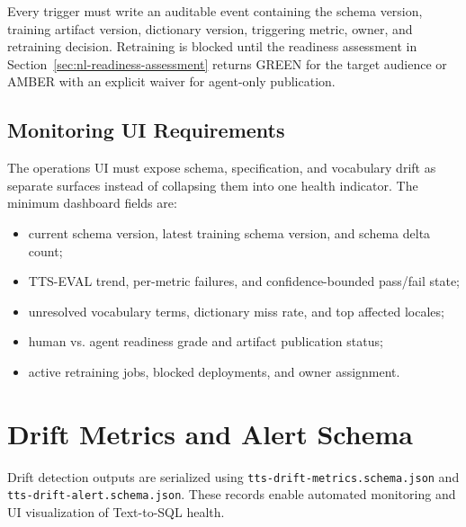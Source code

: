 \noindent
Every trigger must write an auditable event containing the schema version,
training artifact version, dictionary version, triggering metric, owner, and
retraining decision. Retraining is blocked until the readiness assessment in
Section~\ref{sec:nl-readiness-assessment} returns GREEN for the target audience
or AMBER with an explicit waiver for agent-only publication.

\subsection{Monitoring UI Requirements}

The operations UI must expose schema, specification, and vocabulary drift as
separate surfaces instead of collapsing them into one health indicator. The
minimum dashboard fields are:
\begin{itemize}
  \item current schema version, latest training schema version, and schema delta count;
  \item TTS-EVAL trend, per-metric failures, and confidence-bounded pass/fail state;
  \item unresolved vocabulary terms, dictionary miss rate, and top affected locales;
  \item human vs. agent readiness grade and artifact publication status;
  \item active retraining jobs, blocked deployments, and owner assignment.
\end{itemize}

\section{Drift Metrics and Alert Schema}\label{sec:drift-schema}

Drift detection outputs are serialized using \texttt{tts-drift-metrics.schema.json}
and \texttt{tts-drift-alert.schema.json}. These records enable automated
monitoring and UI visualization of Text-to-SQL health.

